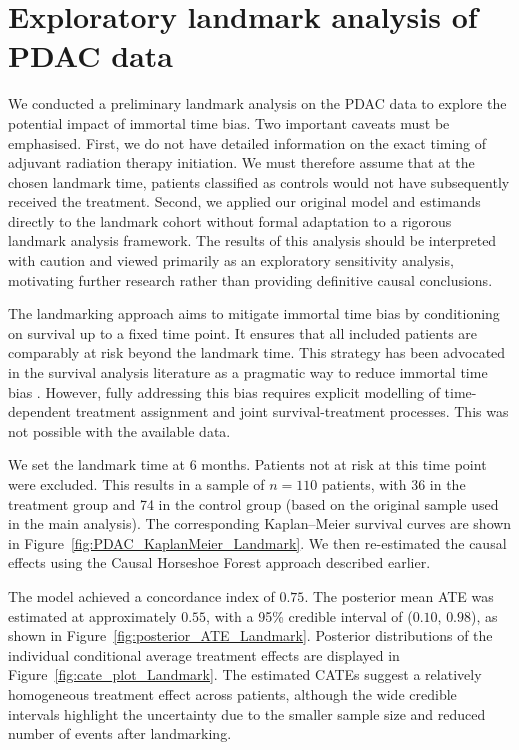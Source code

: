 \section{Exploratory landmark analysis of PDAC data}\label{appendix:landmark}



We conducted a preliminary landmark analysis on the PDAC data to explore the potential impact of immortal time bias.  
Two important caveats must be emphasised. 
First, we do not have detailed information on the exact timing of adjuvant radiation therapy initiation. 
We must therefore assume that at the chosen landmark time, patients classified as controls would not have subsequently received the treatment. 
Second, we applied our original model and estimands directly to the landmark cohort without formal adaptation to a rigorous landmark analysis framework. 
The results of this analysis should be interpreted with caution and viewed primarily as an exploratory sensitivity analysis, motivating further research rather than providing definitive causal conclusions.

The landmarking approach aims to mitigate immortal time bias by conditioning on survival up to a fixed time point.
It ensures that all included patients are comparably at risk beyond the landmark time. 
This strategy has been advocated in the survival analysis literature as a pragmatic way to reduce immortal time bias \citep{vanHouwelingen2007Dynamic}. 
However, fully addressing this bias requires explicit modelling of time-dependent treatment assignment and joint survival-treatment processes. 
This was not possible with the available data.




We set the landmark time at 6 months. 
Patients not at risk at this time point were excluded.
This results in a sample of $n = 110$ patients, with 36 in the treatment group and 74 in the control group (based on the original sample used in the main analysis). 
The corresponding Kaplan--Meier survival curves are shown in Figure~\ref{fig:PDAC_KaplanMeier_Landmark}. 
We then re-estimated the causal effects using the Causal Horseshoe Forest approach described earlier.


The model achieved a concordance index of $0.75$. 
The posterior mean ATE was estimated at approximately $0.55$, with a 95\% credible interval of ($0.10$, $0.98$), as shown in Figure~\ref{fig:posterior_ATE_Landmark}. 
Posterior distributions of the individual conditional average treatment effects are displayed in Figure~\ref{fig:cate_plot_Landmark}. 
The estimated CATEs suggest a relatively homogeneous treatment effect across patients, although the wide credible intervals highlight the uncertainty due to the smaller sample size and reduced number of events after landmarking.



